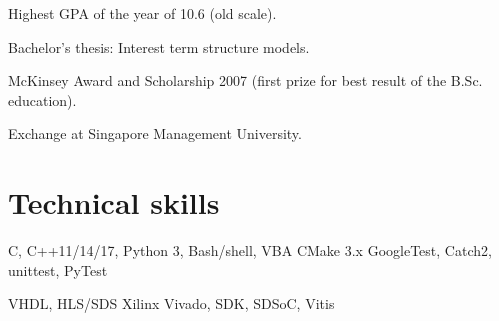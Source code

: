 \documentclass[a4paper]{janus-resume}
\begin{document}
\begin{minipage}[t]{0.49\textwidth}
\sectionspace %

Highest GPA of the year of 10.6 (old scale).
\begin{tightitemize}
\item Bachelor's thesis: Interest term structure models. \\
\item McKinsey Award and Scholarship 2007 (first prize for best result of the B.Sc. education). \\
\item Exchange at Singapore Management University. \\
\end{tightitemize}

\sectionspace %




\sectionspace %


\section{Technical skills}


C, C++11/14/17, Python 3, Bash/shell, VBA
\bluebullet{} CMake 3.x
\bluebullet {} GoogleTest, Catch2, 
 unittest, PyTest \\
\sectionspace %

VHDL, HLS/SDS
\bluebullet{} Xilinx Vivado, SDK, SDSoC, Vitis
\sectionspace %


\end{minipage}
\end{document}
